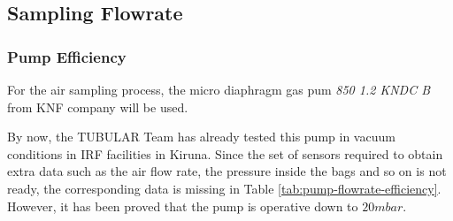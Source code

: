 \subsection{Sampling Flowrate}


\subsubsection{Pump Efficiency}

For the air sampling process, the micro diaphragm gas pum \emph{850 1.2 KNDC B} from KNF company will be used.

By now, the TUBULAR Team has already tested this pump in vacuum conditions in IRF facilities in Kiruna. Since the set of sensors required to obtain extra data such as the air flow rate, the pressure inside the bags and so on is not ready, the corresponding data is missing in Table \ref{tab:pump-flowrate-efficiency}. However, it has been proved that the pump is operative down to $20 mbar$.

